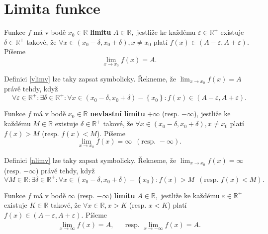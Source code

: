 \section{Limita funkce}\label{limita}
\begin{definition}\label{vlimv}
    Funkce $f$ má v bodě $x_0\in \mathbb R$ \textbf{limitu} $A\in \mathbb R,$
    jestliže ke každému $\varepsilon \in \mathbb R^+$ existuje
    $\delta \in \mathbb R^+$ takové, že $\forall x \in
    \left ( x_0-\delta, x_0+\delta \right ), x\ne x_0 $ platí $f(x)\in
    \left ( A-\varepsilon,A+\varepsilon \right ). $ Píšeme
    $$\lim_{x\to x_0}f(x)=A.$$
\end{definition}

\begin{pozn}
    Definici \ref{vlimv} lze taky zapsat symbolicky. Řekneme, že
    $\lim_{x\to x_0} f(x) =A$ právě tehdy, když
    $$
    \forall \varepsilon \in \mathbb R^+:
        \exists \delta \in \mathbb R^+: \forall x \in
        \left ( x_0-\delta,x_0+\delta \right )-\left \{ x_0 \right \}:
        f(x) \in \left ( A-\varepsilon, A+\varepsilon \right ).
    $$
\end{pozn}

\begin{definition}\label{nlimv}
Funkce $f$ má v bodě $x_0\in \mathbb R$ \textbf{nevlastní limitu} $+\infty$ (resp.
$-\infty$),
jestliže ke každému $M \in \mathbb R$ existuje
$\delta \in \mathbb R^+$ takové, že $\forall x \in
\left ( x_0-\delta, x_0+\delta \right ), x\ne x_0 $ platí $f(x)>M $
(resp. $f(x)<M$). Píšeme
$$\lim_{x\to x_0}f(x)=\infty \,\,\,(\textrm{resp. } -\infty).$$
\end{definition}

\begin{pozn}
    Definici \ref{nlimv} lze taky zapsat symbolicky. Řekneme, že
    $\lim_{x\to x_0} f(x) =\infty$ (resp. $-\infty$) právě tehdy, když
    $$
    \forall M \in \mathbb R:
        \exists \delta \in \mathbb R^+: \forall x \in
        \left ( x_0-\delta,x_0+\delta \right )-\left \{ x_0 \right \}:
        f(x) > M\,\,\, (\textrm{resp. } f(x) < M) .
    $$
\end{pozn}

\begin{definition}\label{vlimn}
Funkce $f$ má v bodě $\infty$ (resp. $-\infty$) \textbf{limitu} $A\in \mathbb R,$
jestliže ke každému $\varepsilon \in \mathbb R^+$ existuje
$K \in \mathbb R$ takové, že $\forall x \in \mathbb R, x > K$ (resp. $x<K$)
platí $f(x)\in \left ( A-\varepsilon,A+\varepsilon \right ). $ Píšeme
\begin{align*}
\lim_{x\to \infty}f(x)=A, & & \textrm{resp. } \lim_{x\to -\infty}f(x)=A.
\end{align*}
\end{definition}

